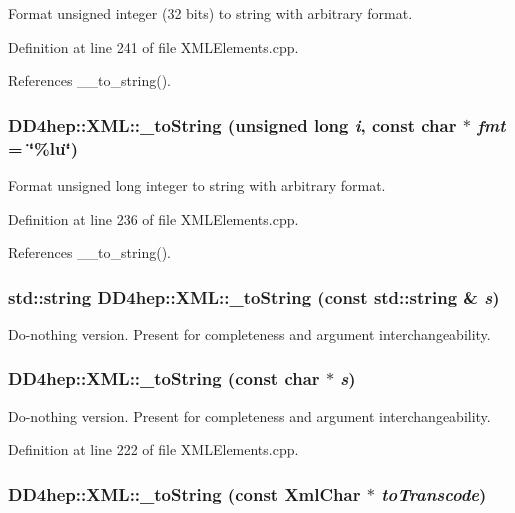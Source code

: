 Format unsigned integer (32 bits) to string with arbitrary format. 

Definition at line 241 of file XMLElements.cpp.

References \_\-\_\-to\_\-string().\hypertarget{group___d_d4_h_e_p___x_m_l_ga52447f7eb531c40682ba02c1271c1030}{
\subsubsection[{\_\-toString}]{ DD4hep::XML::\_\-toString (unsigned long {\em i}, \/  const char $\ast$ {\em fmt} = {\ttfamily \char`\"{}\%lu\char`\"{}})}}
\label{group___d_d4_h_e_p___x_m_l_ga52447f7eb531c40682ba02c1271c1030}


Format unsigned long integer to string with arbitrary format. 

Definition at line 236 of file XMLElements.cpp.

References \_\-\_\-to\_\-string().\hypertarget{group___d_d4_h_e_p___x_m_l_ga11593305fa28cb3f91fd4cb08e0aa670}{
\subsubsection[{\_\-toString}]{\setlength{\rightskip}{0pt plus 5cm}std::string DD4hep::XML::\_\-toString (const std::string \& {\em s})}}
\label{group___d_d4_h_e_p___x_m_l_ga11593305fa28cb3f91fd4cb08e0aa670}


Do-\/nothing version. Present for completeness and argument interchangeability. \hypertarget{group___d_d4_h_e_p___x_m_l_ga7a1c3ef4f1a036d3ccccfd9fff8cd30f}{
\subsubsection[{\_\-toString}]{ DD4hep::XML::\_\-toString (const char $\ast$ {\em s})}}
\label{group___d_d4_h_e_p___x_m_l_ga7a1c3ef4f1a036d3ccccfd9fff8cd30f}


Do-\/nothing version. Present for completeness and argument interchangeability. 

Definition at line 222 of file XMLElements.cpp.\hypertarget{group___d_d4_h_e_p___x_m_l_ga4c56544a190950d18779b16e986783ab}{
\subsubsection[{\_\-toString}]{ DD4hep::XML::\_\-toString (const XmlChar $\ast$ {\em toTranscode})}}
\label{group___d_d4_h_e_p___x_m_l_ga4c56544a190950d18779b16e986783ab}


